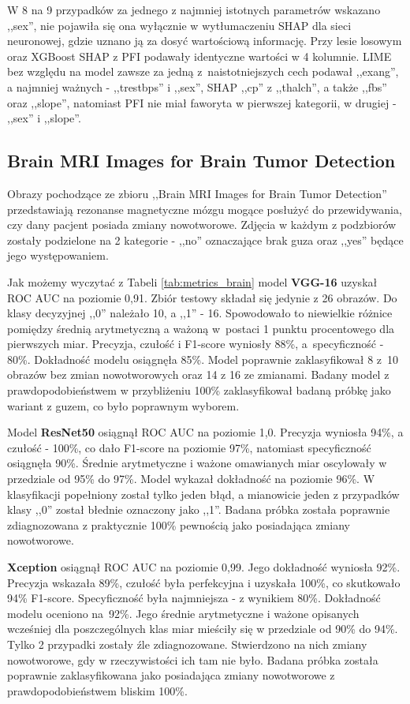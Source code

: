 W 8 na 9 przypadków za jednego z najmniej istotnych parametrów wskazano ,,sex'', nie pojawiła się ona wyłącznie w wytłumaczeniu SHAP dla sieci neuronowej, gdzie uznano ją za dosyć wartościową informację. Przy lesie losowym oraz XGBoost SHAP z PFI podawały identyczne wartości w 4 kolumnie. LIME bez względu na model zawsze za jedną z~naistotniejszych cech podawał ,,exang'', a najmniej ważnych - ,,trestbps'' i ,,sex'', SHAP ,,cp'' z ,,thalch'', a także ,,fbs'' oraz ,,slope'', natomiast PFI nie miał faworyta w pierwszej kategorii, w drugiej - ,,sex'' i ,,slope''.


\subsection{Brain MRI Images for Brain Tumor Detection}
Obrazy pochodzące ze zbioru ,,Brain MRI Images for Brain Tumor Detection'' przedstawiają rezonanse magnetyczne mózgu mogące posłużyć do przewidywania, czy dany pacjent posiada zmiany nowotworowe. Zdjęcia w każdym z podzbiorów zostały podzielone na 2 kategorie - ,,no'' oznaczające brak guza oraz ,,yes'' będące jego występowaniem.

Jak możemy wyczytać z Tabeli \ref{tab:metrics_brain} model \textbf{VGG-16} uzyskał ROC AUC na poziomie 0,91. Zbiór testowy składał się jedynie z 26 obrazów. Do klasy decyzyjnej ,,0'' należało 10, a ,,1'' - 16. Spowodowało to niewielkie różnice pomiędzy średnią arytmetyczną a ważoną w~postaci 1 punktu procentowego dla pierwszych miar. Precyzja, czułość i F1-score wyniosły 88\%, a~specyficzność - 80\%. Dokładność modelu osiągnęła 85\%. Model poprawnie zaklasyfikował 8 z~10 obrazów bez zmian nowotworowych oraz 14 z 16 ze zmianami. Badany model z prawdopodobieństwem w przybliżeniu 100\% zaklasyfikował badaną próbkę jako wariant z guzem, co było poprawnym wyborem.

Model \textbf{ResNet50} osiągnął ROC AUC na poziomie 1,0. Precyzja wyniosła 94\%, a czułość - 100\%, co dało F1-score na poziomie 97\%, natomiast specyficzność osiągnęła 90\%. Średnie arytmetyczne i ważone omawianych miar oscylowały w przedziale od 95\% do 97\%. Model wykazał dokładność na poziomie 96\%. W klasyfikacji popełniony został tylko jeden błąd, a mianowicie jeden z przypadków klasy ,,0'' został błednie oznaczony jako ,,1''. Badana próbka została poprawnie zdiagnozowana z praktycznie 100\% pewnością jako posiadająca zmiany nowotworowe.

\textbf{Xception} osiągnął ROC AUC na poziomie 0,99. Jego dokładność wyniosła 92\%. Precyzja wskazała 89\%, czułość była perfekcyjna i uzyskała 100\%, co skutkowało 94\% F1-score. Specyficzność była najmniejsza - z wynikiem 80\%. Dokładność modelu oceniono na~92\%. Jego średnie arytmetyczne i ważone opisanych wcześniej dla poszczególnych klas miar mieściły się w przedziale od 90\% do 94\%. Tylko 2 przypadki zostały źle zdiagnozowane. Stwierdzono na nich zmiany nowotworowe, gdy w rzeczywistości ich tam nie było. Badana próbka została poprawnie zaklasyfikowana jako posiadająca zmiany nowotworowe z prawdopodobieństwem bliskim 100\%. 


